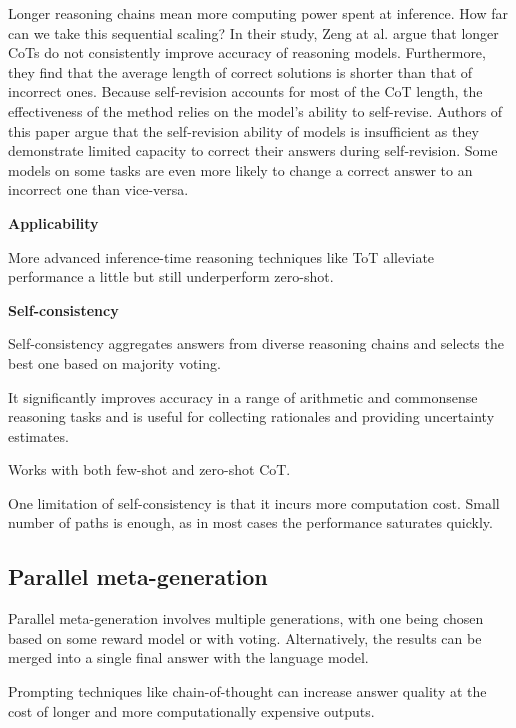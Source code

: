 Longer reasoning chains mean more computing power spent at inference. How far can we take this sequential scaling?
In their study, Zeng at al.\cite{zeng2025revisitingtesttimescalingo1like} argue that longer CoTs do not consistently improve accuracy of reasoning models.
Furthermore, they find that the average length of correct solutions is shorter than that of incorrect ones. 
Because self-revision accounts for most of the CoT length, the effectiveness of the method relies on the model's ability to self-revise.
Authors of this paper argue that the self-revision ability of models is insufficient as they demonstrate limited capacity to correct their answers
during self-revision. Some models on some tasks are even more likely to change a correct answer to an incorrect one than vice-versa.

\textbf{Applicability}


More advanced inference-time reasoning techniques like ToT alleviate performance a little but still underperform zero-shot. \cite{liu2024mindstepbystep}

\textbf{Self-consistency}

Self-consistency aggregates answers from diverse reasoning chains and selects the best one based on majority voting. \cite{wang2023selfconsistencyimproveschainthought}

It significantly improves accuracy in a range of arithmetic and commonsense reasoning tasks and is useful for collecting rationales and providing uncertainty estimates. \cite{wang2023selfconsistencyimproveschainthought}

Works with both few-shot and zero-shot CoT. \cite{wang2023selfconsistencyimproveschainthought}

One limitation of self-consistency is that it incurs more computation cost. Small number of paths is enough, as in most cases the performance saturates quickly. \cite{wang2023selfconsistencyimproveschainthought}

\subsection{Parallel meta-generation}

Parallel meta-generation involves multiple generations, with one being chosen based on some reward model or with voting. Alternatively, the results can be merged into a single final answer with the language model. \cite{welleck2024decodingmetagenerationinferencetimealgorithms}


Prompting techniques like chain-of-thought can increase answer quality at the cost of longer and more computationally expensive outputs. \cite{brown2024largelanguagemonkeysscaling}

